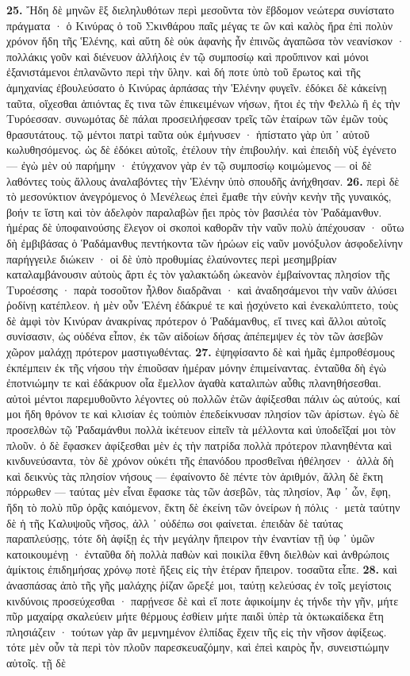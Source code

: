 \documentclass[a4paper, 11pt, oneside, polutonikogreek, german]{article}
\begin{document}
\textbf{25.} Ἤδη δὲ μηνῶν ἓξ διεληλυθότων περὶ μεσοῦντα τὸν ἕβδομον νεώτερα συνίστατο πράγματα · ὁ Κινύρας ὁ τοῦ Σκινθάρου παῖς μέγας τε ὢν καὶ καλὸς ἤρα ἐπὶ πολὺν χρόνον ἤδη τῆς Ἑλένης, καὶ αὕτη δὲ οὐκ ἀφανὴς ἦν ἐπινῶς ἀγαπῶσα τὸν νεανίσκον · πολλάκις γοῦν καὶ διένευον ἀλλήλοις ἐν τῷ συμποσίῳ καὶ προὔπινον καὶ μόνοι ἐξανιστάμενοι ἐπλανῶντο περὶ τὴν ὕλην. καὶ δή ποτε ὑπὸ τοῦ ἔρωτος καὶ τῆς ἀμηχανίας ἐβουλεύσατο ὁ Κινύρας ἁρπάσας τὴν Ἑλένην φυγεῖν. ἐδόκει δὲ κἀκείνῃ ταῦτα, οἴχεσθαι ἀπιόντας ἔς τινα τῶν ἐπικειμένων νήσων, ἤτοι ἐς τὴν Φελλὼ ἢ ἐς τὴν Τυρόεσσαν. συνωμότας δὲ πάλαι προσειλήφεσαν τρεῖς τῶν ἑταίρων τῶν ἐμῶν τοὺς θρασυτάτους. τῷ μέντοι πατρὶ ταῦτα οὐκ ἐμήνυσεν · ἠπίστατο γὰρ ὑπ ᾽ αὐτοῦ κωλυθησόμενος. ὡς δὲ ἐδόκει αὐτοῖς, ἐτέλουν τὴν ἐπιβουλήν. καὶ ἐπειδὴ νὺξ ἐγένετο --- ἐγὼ μὲν οὐ παρήμην · ἐτύγχανον γὰρ ἐν τῷ συμποσίῳ κοιμώμενος --- οἱ δὲ λαθόντες τοὺς ἄλλους ἀναλαβόντες τὴν Ἑλένην ὑπὸ σπουδῆς ἀνήχθησαν. \textbf{26.} περὶ δὲ τὸ μεσονύκτιον ἀνεγρόμενος ὁ Μενέλεως ἐπεὶ ἔμαθε τὴν εὐνὴν κενὴν τῆς γυναικός, βοήν τε ἵστη καὶ τὸν ἀδελφὸν παραλαβὼν ᾔει πρὸς τὸν βασιλέα τὸν Ῥαδάμανθυν. ἡμέρας δὲ ὑποφαινούσης ἔλεγον οἱ σκοποὶ καθορᾶν τὴν ναῦν πολὺ ἀπέχουσαν · οὕτω δὴ ἐμβιβάσας ὁ Ῥαδάμανθυς πεντήκοντα τῶν ἡρώων εἰς ναῦν μονόξυλον ἀσφοδελίνην παρήγγειλε διώκειν · οἱ δὲ ὑπὸ προθυμίας ἐλαύνοντες περὶ μεσημβρίαν καταλαμβάνουσιν αὐτοὺς ἄρτι ἐς τὸν γαλακτώδη ὠκεανὸν ἐμβαίνοντας πλησίον τῆς Τυροέσσης · παρὰ τοσοῦτον ἦλθον διαδρᾶναι · καὶ ἀναδησάμενοι τὴν ναῦν ἁλύσει ῥοδίνῃ κατέπλεον. ἡ μὲν οὖν Ἑλένη ἐδάκρυέ τε καὶ ᾐσχύνετο καὶ ἐνεκαλύπτετο, τοὺς δὲ ἀμφὶ τὸν Κινύραν ἀνακρίνας πρότερον ὁ Ῥαδάμανθυς, εἴ τινες καὶ ἄλλοι αὐτοῖς συνίσασιν, ὡς οὐδένα εἶπον, ἐκ τῶν αἰδοίων δήσας ἀπέπεμψεν ἐς τὸν τῶν ἀσεβῶν χῶρον μαλάχῃ πρότερον μαστιγωθέντας. \textbf{27.} ἐψηφίσαντο δὲ καὶ ἡμᾶς ἐμπροθέσμους ἐκπέμπειν ἐκ τῆς νήσου τὴν ἐπιοῦσαν ἡμέραν μόνην ἐπιμείναντας. ἐνταῦθα δὴ ἐγὼ ἐποτνιώμην τε καὶ ἐδάκρυον οἷα ἔμελλον ἀγαθὰ καταλιπὼν αὖθις πλανηθήσεσθαι. αὐτοὶ μέντοι παρεμυθοῦντο λέγοντες οὐ πολλῶν ἐτῶν ἀφίξεσθαι πάλιν ὡς αὐτούς, καί μοι ἤδη θρόνον τε καὶ κλισίαν ἐς τοὐπιὸν ἐπεδείκνυσαν πλησίον τῶν ἀρίστων. ἐγὼ δὲ προσελθὼν τῷ Ῥαδαμάνθυι πολλὰ ἱκέτευον εἰπεῖν τὰ μέλλοντα καὶ ὑποδεῖξαί μοι τὸν πλοῦν. ὁ δὲ ἔφασκεν ἀφίξεσθαι μὲν ἐς τὴν πατρίδα πολλὰ πρότερον πλανηθέντα καὶ κινδυνεύσαντα, τὸν δὲ χρόνον οὐκέτι τῆς ἐπανόδου προσθεῖναι ἠθέλησεν · ἀλλὰ δὴ καὶ δεικνὺς τὰς πλησίον νήσους --- ἐφαίνοντο δὲ πέντε τὸν ἀριθμόν, ἄλλη δὲ ἕκτη πόρρωθεν --- ταύτας μὲν εἶναι ἔφασκε τὰς τῶν ἀσεβῶν, τὰς πλησίον, Ἀφ ᾽ ὦν, ἔφη, ἤδη τὸ πολὺ πῦρ ὁρᾷς καιόμενον, ἕκτη δὲ ἐκείνη τῶν ὀνείρων ἡ πόλις · μετὰ ταύτην δὲ ἡ τῆς Καλυψοῦς νῆσος, ἀλλ ᾽ οὐδέπω σοι φαίνεται. ἐπειδὰν δὲ ταύτας παραπλεύσῃς, τότε δὴ ἀφίξῃ ἐς τὴν μεγάλην ἤπειρον τὴν ἐναντίαν τῇ ὑφ ᾽ ὑμῶν κατοικουμένῃ · ἐνταῦθα δὴ πολλὰ παθὼν καὶ ποικίλα ἔθνη διελθὼν καὶ ἀνθρώποις ἀμίκτοις ἐπιδημήσας χρόνῳ ποτὲ ἥξεις εἰς τὴν ἑτέραν ἤπειρον. τοσαῦτα εἶπε. \textbf{28.} καὶ ἀνασπάσας ἀπὸ τῆς γῆς μαλάχης ῥίζαν ὤρεξέ μοι, ταύτῃ κελεύσας ἐν τοῖς μεγίστοις κινδύνοις προσεύχεσθαι · παρῄνεσε δὲ καὶ εἴ ποτε ἀφικοίμην ἐς τήνδε τὴν γῆν, μήτε πῦρ μαχαίρᾳ σκαλεύειν μήτε θέρμους ἐσθίειν μήτε παιδὶ ὑπὲρ τὰ ὀκτωκαίδεκα ἔτη πλησιάζειν · τούτων γὰρ ἂν μεμνημένον ἐλπίδας ἔχειν τῆς εἰς τὴν νῆσον ἀφίξεως. τότε μὲν οὖν τὰ περὶ τὸν πλοῦν παρεσκευαζόμην, καὶ ἐπεὶ καιρὸς ἦν, συνειστιώμην αὐτοῖς. τῇ δὲ 
\end{document}
